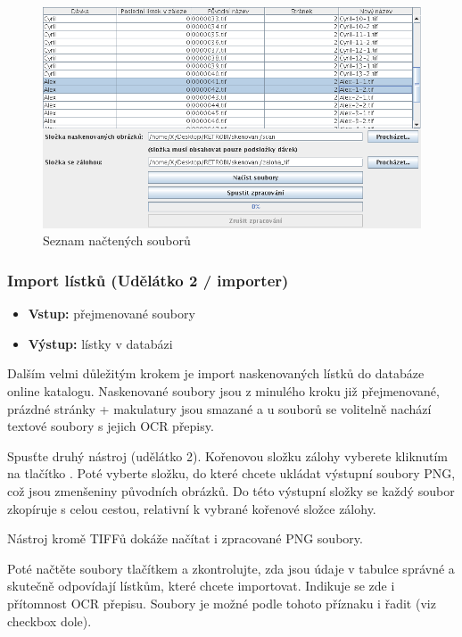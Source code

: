 \begin{figure}
\label{fig:u1}
\centering
\includegraphics[width=\textwidth]{u1.png}
\caption{Seznam načtených souborů}
\end{figure}

\subsubsection{Import lístků (Udělátko 2 / importer)}

\begin{itemize}
\item{{\bf Vstup:} přejmenované soubory}
\item{{\bf Výstup:} lístky v databázi}
\end{itemize}

Dalším velmi důležitým krokem je import naskenovaných lístků do databáze online katalogu. Naskenované soubory jsou z minulého kroku již přejmenované, prázdné stránky + makulatury jsou smazané a u souborů se volitelně nachází textové soubory s jejich OCR přepisy.

Spusťte druhý nástroj (udělátko 2). Kořenovou složku zálohy vyberete kliknutím na tlačítko . Poté vyberte složku, do které chcete ukládat výstupní soubory PNG, což jsou zmenšeniny původních obrázků. Do této výstupní složky se každý soubor zkopíruje s celou cestou, relativní k vybrané kořenové složce zálohy.

{\color{OliveGreen} Nástroj kromě TIFFů dokáže načítat i zpracované PNG soubory.}

Poté načtěte soubory tlačítkem  a zkontrolujte, zda jsou údaje v tabulce správné a skutečně odpovídají lístkům, které chcete importovat. Indikuje se zde i přítomnost OCR přepisu. Soubory je možné podle tohoto příznaku i řadit (viz checkbox  dole).

